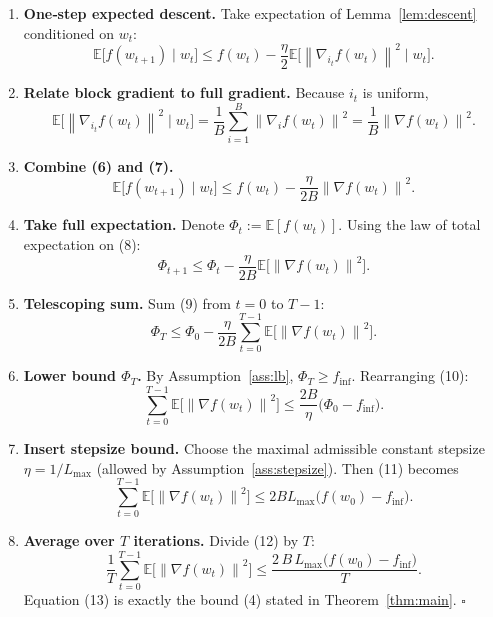 \documentclass{article}
\newcommand{\E}{\mathbb{E}}
\newcommand{\norm}[1]{\left\|#1\right\|}
\newcommand{\grad}{\nabla}
\begin{document}
\begin{enumerate}[label=[Step \arabic*]]
\item \textbf{One‑step expected descent.}  
Take expectation of Lemma~\ref{lem:descent} conditioned on $w_t$:
\[
\E\!\bigl[f(w_{t+1})\mid w_t\bigr]
\le f(w_t)-\frac{\eta}{2}\E\!\bigl[\norm{\grad_{i_t}f(w_t)}^{2}\mid w_t\bigr].
\tag{6}
\]

\item \textbf{Relate block gradient to full gradient.}  
Because $i_t$ is uniform,
\[
\E\!\bigl[\norm{\grad_{i_t}f(w_t)}^{2}\mid w_t\bigr]
=\frac1B\sum_{i=1}^{B}\norm{\grad_i f(w_t)}^{2}
=\frac1B\norm{\grad f(w_t)}^{2}.
\tag{7}
\]

\item \textbf{Combine (6) and (7).}
\[
\E\!\bigl[f(w_{t+1})\mid w_t\bigr]
\le f(w_t)-\frac{\eta}{2B}\norm{\grad f(w_t)}^{2}.
\tag{8}
\]

\item \textbf{Take full expectation.}  
Denote $\Phi_t:=\E[f(w_t)]$.  Using the law of total expectation on (8):
\[
\Phi_{t+1}\le \Phi_t-\frac{\eta}{2B}\E\!\bigl[\norm{\grad f(w_t)}^{2}\bigr].
\tag{9}
\]

\item \textbf{Telescoping sum.}  
Sum (9) from $t=0$ to $T-1$:
\[
\Phi_T\le \Phi_0-\frac{\eta}{2B}\sum_{t=0}^{T-1}
\E\!\bigl[\norm{\grad f(w_t)}^{2}\bigr].
\tag{10}
\]

\item \textbf{Lower bound $\Phi_T$.}  
By Assumption~\ref{ass:lb}, $\Phi_T\ge f_{\inf}$.  Rearranging (10):
\[
\sum_{t=0}^{T-1}\E\!\bigl[\norm{\grad f(w_t)}^{2}\bigr]
\le \frac{2B}{\eta}\bigl(\Phi_0-f_{\inf}\bigr).
\tag{11}
\]

\item \textbf{Insert stepsize bound.}  
Choose the maximal admissible constant stepsize $\eta=1/L_{\max}$ (allowed by
Assumption~\ref{ass:stepsize}).  Then (11) becomes
\[
\sum_{t=0}^{T-1}\E\!\bigl[\norm{\grad f(w_t)}^{2}\bigr]
\le 2B L_{\max}\bigl(f(w_0)-f_{\inf}\bigr).
\tag{12}
\]

\item \textbf{Average over $T$ iterations.}
Divide (12) by $T$:
\[
\frac1T\sum_{t=0}^{T-1}\E\!\bigl[\norm{\grad f(w_t)}^{2}\bigr]
\le \frac{2\,B\,L_{\max}\bigl(f(w_0)-f_{\inf}\bigr)}{T}.
\tag{13}
\]
Equation (13) is exactly the bound (4) stated in Theorem~\ref{thm:main}.
\hfill $\square$
\end{enumerate}
\end{document}
